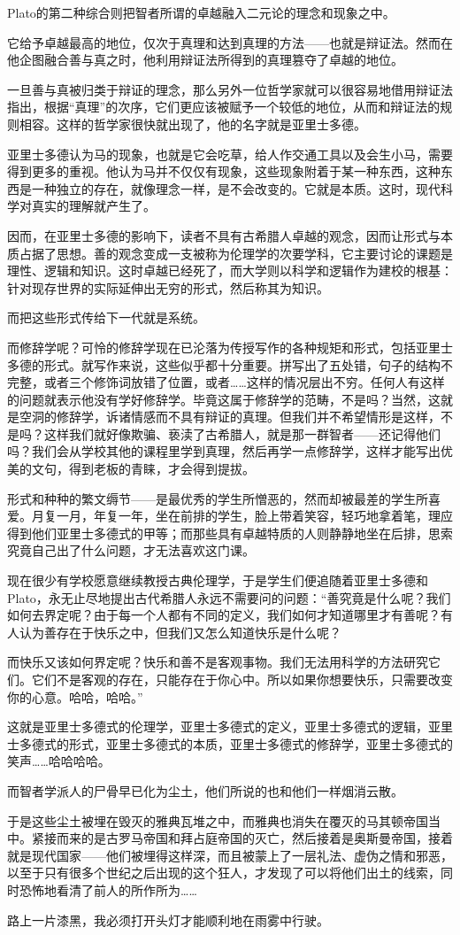 \documentclass[UTF8]{article}
\begin{document}
\par Plato的第二种综合则把智者所谓的卓越融入二元论的理念和现象之中。
\par 它给予卓越最高的地位，仅次于真理和达到真理的方法——也就是辩证法。然而在他企图融合善与真之时，他利用辩证法所得到的真理篡夺了卓越的地位。
\par 一旦善与真被归类于辩证的理念，那么另外一位哲学家就可以很容易地借用辩证法指出，根据“真理”的次序，它们更应该被赋予一个较低的地位，从而和辩证法的规则相容。这样的哲学家很快就出现了，他的名字就是亚里士多德。
\par 亚里士多德认为马的现象，也就是它会吃草，给人作交通工具以及会生小马，需要得到更多的重视。他认为马并不仅仅有现象，这些现象附着于某一种东西，这种东西是一种独立的存在，就像理念一样，是不会改变的。它就是本质。这时，现代科学对真实的理解就产生了。
\par 因而，在亚里士多德的影响下，读者不具有古希腊人卓越的观念，因而让形式与本质占据了思想。善的观念变成一支被称为伦理学的次要学科，它主要讨论的课题是理性、逻辑和知识。这时卓越已经死了，而大学则以科学和逻辑作为建校的根基：针对现存世界的实际延伸出无穷的形式，然后称其为知识。
\par 而把这些形式传给下一代就是系统。
\par 而修辞学呢？可怜的修辞学现在已沦落为传授写作的各种规矩和形式，包括亚里士多德的形式。就写作来说，这些似乎都十分重要。拼写出了五处错，句子的结构不完整，或者三个修饰词放错了位置，或者……这样的情况层出不穷。任何人有这样的问题就表示他没有学好修辞学。毕竟这属于修辞学的范畴，不是吗？当然，这就是空洞的修辞学，诉诸情感而不具有辩证的真理。但我们并不希望情形是这样，不是吗？这样我们就好像欺骗、亵渎了古希腊人，就是那一群智者——还记得他们吗？我们会从学校其他的课程里学到真理，然后再学一点修辞学，这样才能写出优美的文句，得到老板的青睐，才会得到提拔。
\par 形式和种种的繁文缛节——是最优秀的学生所憎恶的，然而却被最差的学生所喜爱。月复一月，年复一年，坐在前排的学生，脸上带着笑容，轻巧地拿着笔，理应得到他们亚里士多德式的甲等；而那些具有卓越特质的人则静静地坐在后排，思索究竟自己出了什么问题，才无法喜欢这门课。
\par 现在很少有学校愿意继续教授古典伦理学，于是学生们便追随着亚里士多德和Plato，永无止尽地提出古代希腊人永远不需要问的问题：“善究竟是什么呢？我们如何去界定呢？由于每一个人都有不同的定义，我们如何才知道哪里才有善呢？有人认为善存在于快乐之中，但我们又怎么知道快乐是什么呢？
\par 而快乐又该如何界定呢？快乐和善不是客观事物。我们无法用科学的方法研究它们。它们不是客观的存在，只能存在于你心中。所以如果你想要快乐，只需要改变你的心意。哈哈，哈哈。”
\par 这就是亚里士多德式的伦理学，亚里士多德式的定义，亚里士多德式的逻辑，亚里士多德式的形式，亚里士多德式的本质，亚里士多德式的修辞学，亚里士多德式的笑声……哈哈哈哈。
\par 而智者学派人的尸骨早已化为尘土，他们所说的也和他们一样烟消云散。
\par 于是这些尘土被埋在毁灭的雅典瓦堆之中，而雅典也消失在覆灭的马其顿帝国当中。紧接而来的是古罗马帝国和拜占庭帝国的灭亡，然后接着是奥斯曼帝国，接着就是现代国家——他们被埋得这样深，而且被蒙上了一层礼法、虚伪之情和邪恶，以至于只有很多个世纪之后出现的这个狂人，才发现了可以将他们出土的线索，同时恐怖地看清了前人的所作所为……
\par 路上一片漆黑，我必须打开头灯才能顺利地在雨雾中行驶。
\end{document}
